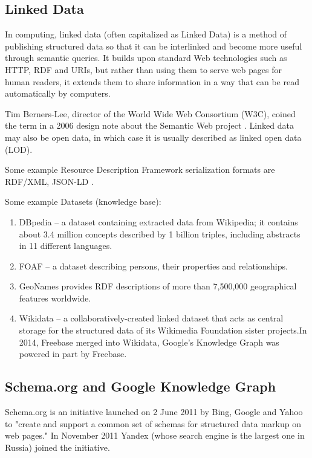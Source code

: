\subsection{Linked Data}

In computing, linked data (often capitalized as Linked Data) is a method of publishing structured data so that it can be interlinked and become more useful through semantic queries. It builds upon standard Web technologies such as HTTP, RDF and URIs, but rather than using them to serve web pages for human readers, it extends them to share information in a way that can be read automatically by computers.

Tim Berners-Lee, director of the World Wide Web Consortium (W3C), coined the term in a 2006 design note about the Semantic Web project \cite{LinkedData}. Linked data may also be open data, in which case it is usually described as linked open data (LOD).

Some example Resource Description Framework serialization formats are RDF/XML, JSON-LD \cite{JSON-LD} . 

Some example Datasets (knowledge base):

\begin{enumerate}
    \item 
    DBpedia – a dataset containing extracted data from Wikipedia; it contains about 3.4 million concepts described by 1 billion triples, including abstracts in 11 different languages.
    \item
    FOAF \cite{FOAF} – a dataset describing persons, their properties and relationships.
    \item
    GeoNames provides RDF descriptions of more than 7,500,000 geographical features worldwide.
    \item
    Wikidata – a collaboratively-created linked dataset that acts as central storage for the structured data of its Wikimedia Foundation sister projects.In 2014, Freebase \cite{Freebase} merged into Wikidata, Google's Knowledge Graph was powered in part by Freebase.
\end{enumerate}

\subsection{Schema.org and Google Knowledge Graph}

Schema.org \cite{Schema.org} is an initiative launched on 2 June 2011 by Bing, Google and Yahoo to "create and support a common set of schemas for structured data markup on web pages." In November 2011 Yandex (whose search engine is the largest one in Russia) joined the initiative.

